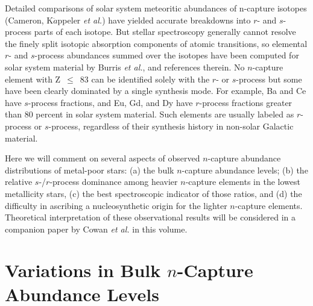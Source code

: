                                                                                                                                                                                                                                                                                                                                                                                                                                                                                                                                                                                                                                                                                                                                                                                                                                                                                                                                                                                                                                                                                                                                                                                                                                                                                                                                                                                                                                                                                                                                                                                                                                                                                                                                                                                                                                                                                                                                                                                                                                                                                                                                                                                                                                                                                                                                                                                                                                                                                                                                                                                                                                                                                                                                                                                                                                                                                                                                                                                                                                                                                                                                                                                                                                                                                                                                                                                                                                                                                                                                                                                                                                                                                                                                                                                                                                                                                                                                                                                                                                                                                                                                                                                                                                                                                                                                                                                                                                                                                                                                                                                                                                                                                                                                                                                                                                                                                                                                                                                                                                                                                                                                                                                                                                                                                                                                                                                                                                                                                                                                                                                                                                                                                                                                                                                                                                                                                                                                                                                                                                                                                                                                                                                                                                                                                                                                                                                                                                                                                                                                                                                                                                                                                                                                                                                                                                                                                                                                                                                                                                                                                                                                                                                                                                                                                                                                                                                                                                                                                                                                                                                                                                                                                                                                                                                                                                                                                                                                                                                                                                                                                                                                                                                                                                                                                                                                                                                                                                                                                                                                                                                                                                                                                                                                                                                                                                                                                                                                                                                                                                                                                                                                                                                                                                                                                                                                                                                                                                                                                                                                                                                                                                                                                                                                                                                                                                                                                                                                                                                                                                                                                                                                                                                                                                                                                                                                                                                                                                                                                                                                                                                                                                                                                                                                                                                                                                                                                                                                                                                                                                                                                                                                                                                                                                                                                                                                                                                                                                                                                                                                                                                                                                                                                                                                                                                                                                                                                                                                                                                                                                                                                                                                                                                                                                                                                                                                                                                                                                                                                                                                                                                                                                                                                                                                                                                                                                                                                                                                                                                                                                                                                                                                                                                                                                                                                                                                                                                                                                                                                                                                                                                                                                                                                                                                                                                                                                                                                                                                                                                                                                                                                                                                                                                                                                                                                                                                                                                                                                                                                                                                                                                                                                                                                                                                                                                                                                                                                                                                                                                                                                                                                                                                                                                                                                                                                                                                                                                                                                                                                                                                                                                                                                                                                                                                                                                            \documentclass{ws-p8-50x6-00}
\begin{document}
Detailed comparisons of solar system meteoritic abundances of n-capture 
isotopes (Cameron\cite{Ca82}, K$\ddot{a}$ppeler {\it et al.}\cite{Ka89}) 
have yielded 
accurate breakdowns into $r$- and $s$-process parts of each isotope.  
But stellar spectroscopy generally cannot resolve the finely split isotopic
absorption components of atomic transitions, so elemental $r$- and
$s$-process abundances summed over the isotopes have been computed 
for solar system material by Burris {\it et al.}\cite{Bu00},
and references therein.  
No $n$-capture element with Z~$\leq$~83 can be identified solely
with the $r$- or $s$-process but some have been clearly dominated by a 
single synthesis mode.  
For example, Ba and Ce have $s$-process fractions, and Eu, Gd, and Dy have
$r$-process fractions greater than 80 percent  in solar system material.
Such elements are usually labeled as $r$-process or $s$-process,
regardless of their synthesis history in non-solar Galactic material.
 
Here we will comment on several aspects of observed 
$n$-capture abundance distributions of metal-poor stars: 
(a) the bulk $n$-capture abundance levels; (b) the relative $s$-/$r$-process 
dominance among heavier $n$-capture elements in the lowest metallicity 
stars, (c) the best spectroscopic indicator of those ratios, and (d) the
difficulty in ascribing a nucleosynthetic origin for the lighter 
$n$-capture elements.  
Theoretical interpretation of these observational results will be 
considered in a companion paper by Cowan {\it et al.} in this volume.






\section{Variations in Bulk $n$-Capture Abundance Levels}
\end{document}
